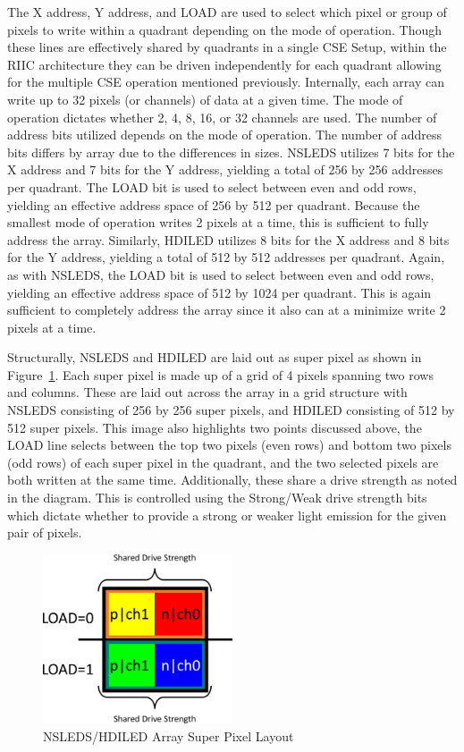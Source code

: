     The X address, Y address, and LOAD are used to select which pixel or group of pixels to write within a quadrant depending on the mode of operation. Though these lines are effectively shared by quadrants in a single CSE Setup, within the RIIC architecture they can be driven independently for each quadrant allowing for the multiple CSE operation mentioned previously. Internally, each array can write up to 32 pixels (or channels) of data at a given time. The mode of operation dictates whether 2, 4, 8, 16, or 32 channels are used. The number of address bits utilized depends on the mode of operation. The number of address bits differs by array due to the differences in sizes. NSLEDS utilizes 7 bits for the X address and 7 bits for the Y address, yielding a total of 256 by 256 addresses per quadrant. The LOAD bit is used to select between even and odd rows, yielding an effective address space of 256 by 512 per quadrant. Because the smallest mode of operation writes 2 pixels at a time, this is sufficient to fully address the array. Similarly, HDILED utilizes 8 bits for the X address and 8 bits for the Y address, yielding a total of 512 by 512 addresses per quadrant. Again, as with NSLEDS, the LOAD bit is used to select between even and odd rows, yielding an effective address space of 512 by 1024 per quadrant. This is again sufficient to completely address the array since it also can at a minimize write 2 pixels at a time.

    Structurally, NSLEDS and HDILED are laid out as super pixel as shown in Figure~\ref{fig:nsleds_hdiled_array_superpixel_layout}. Each super pixel is made up of a grid of 4 pixels spanning two rows and columns. These are laid out across the array in a grid structure with NSLEDS consisting of 256 by 256 super pixels, and HDILED consisting of 512 by 512 super pixels. This image also highlights two points discussed above, the LOAD line selects between the top two pixels (even rows) and bottom two pixels (odd rows) of each super pixel in the quadrant, and the two selected pixels are both written at the same time. Additionally, these share a drive strength as noted in the diagram. This is controlled using the Strong/Weak drive strength bits which dictate whether to provide a strong or weaker light emission for the given pair of pixels.

    \begin{figure}
        \centering
        \includegraphics[width=0.50\textwidth]{fig/superpixel_layout.pdf}
        \caption{NSLEDS/HDILED Array Super Pixel Layout}
        \label{fig:nsleds_hdiled_array_superpixel_layout}
    \end{figure}


